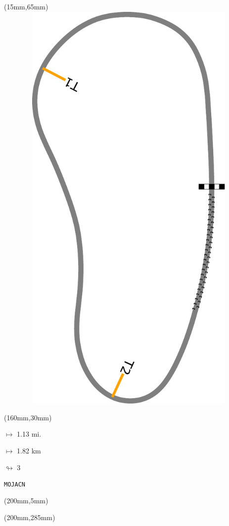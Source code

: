 \begin{textblock*}{185mm}(15mm,65mm)%
\centering
\mbox{\includegraphics[width=185mm,height=210mm,keepaspectratio]{PT/MOJACN.pdf}}
\end{textblock*}
\begin{textblock*}{40mm}(160mm,30mm)%
\Large
\par$\mapsto$ 1.13 mi.
\par$\mapsto$ 1.82 km
\par$\looparrowright$ 3
\par\hfill\tiny\tt MOJACN\\
\end{textblock*}
\begin{textblock*}{20mm}(200mm,5mm)%
\fbox{\thepage}
\label{MOJACN}
\end{textblock*}
\begin{textblock*}{20mm}(200mm,285mm)%
\fbox{\thepage}
\end{textblock*}

